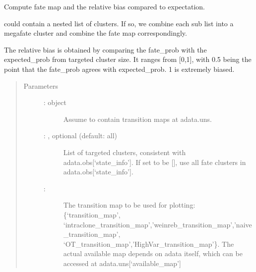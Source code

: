 \documentclass[letterpaper,10pt,english]{sphinxmanual}
\begin{document}
\begin{fulllineitems}
\label{\detokenize{cospar.hf.compute_fate_map_and_intrinsic_bias:cospar.hf.compute_fate_map_and_intrinsic_bias}}
Compute fate map and the relative bias compared to expectation.

 could contain a nested list of clusters. If so, we combine each sub list
into a mega\sphinxhyphen{}fate cluster and combine the fate map correspondingly.

The relative bias is obtained by comparing the fate\_prob with the
expected\_prob from targeted cluster size. It ranges from {[}0,1{]},
with 0.5 being the point that the fate\_prob agrees with expected\_prob.
1 is extremely biased.
\begin{quote}\begin{description}
\item[{Parameters}] \leavevmode\begin{description}
\item[{ :  object}] \leavevmode
Assume to contain transition maps at adata.uns.

\item[{ : , optional (default: all)}] \leavevmode
List of targeted clusters, consistent with adata.obs{[}‘state\_info’{]}.
If set to be {[}{]}, use all fate clusters in adata.obs{[}‘state\_info’{]}.

\item[{ : }] \leavevmode
The transition map to be used for plotting: \{‘transition\_map’,
‘intraclone\_transition\_map’,’weinreb\_transition\_map’,’naive\_transition\_map’,
‘OT\_transition\_map’,’HighVar\_transition\_map’\}. The actual available
map depends on adata itself, which can be accessed at adata.uns{[}‘available\_map’{]}


\end{description}
\end{description}
\end{quote}
\end{fulllineitems}
\end{document}
